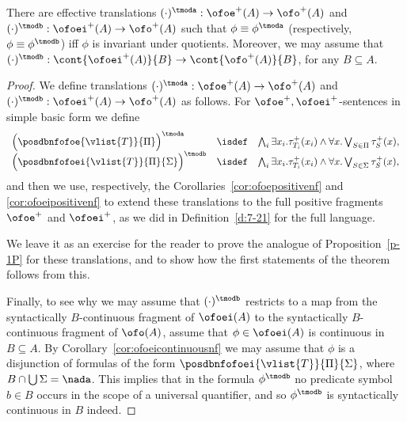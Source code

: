 \begin{theorem}
\label{t:inv1}
There are effective translations $(\cdot)^{\tmoda}: \ofoe^{+}(A) \to 
\ofo^{+}(A)$ and $(\cdot)^{\tmodb}: {\ofoei}^{+}(A) \to \ofo^{+}(A)$ such that 
$\phi \equiv \phi^{\tmoda}$ (respectively, $\phi \equiv \phi^{\tmodb}$) iff 
$\phi$ is invariant under quotients.
Moreover, we may assume that 
$(\cdot)^{\tmodb}: \cont{{\ofoei}^{+}(A)}{B} \to \cont{\ofo^{+}(A)}{B}$,
for any $B \subseteq A$.
\end{theorem}
\begin{proof}
We define translations $(\cdot)^{\tmoda}: {\ofoe}^{+}(A) \to {\ofo}^{+}(A)$ and 
$(\cdot)^{\tmodb}: {\ofoei}^{+}(A) \to {\ofo}^{+}(A)$ as follows. 
For $\ofoe^{+},{\ofoei}^{+}$-sentences in simple basic form we define
\[\begin{array}{lll}
     \Big( \posdbnfofoe{\vlist{T}}{\Pi} \Big)^{\tmoda} 
   & \isdef 
   & \bigwedge_{i} \exists x_i. \tau^+_{T_i}(x_i) 
     \land \forall x. \bigvee_{S\in\Pi} \tau^+_S(x),
\\   \Big( \posdbnfofoei{\vlist{T}}{\Pi}{\Sigma} \Big)^{\tmodb} 
   & \isdef 
   & \bigwedge_{i} \exists x_i. \tau^+_{T_i}(x_i) 
     \land \forall x. \bigvee_{S\in\Sigma} \tau^+_S(x),
\end{array}\]
and then we use, respectively, the Corollaries~\ref{cor:ofoepositivenf} and
\ref{cor:ofoeipositivenf} to extend these translations to the full positive
fragments $\ofoe^{+}$ and ${\ofoei}^{+}$, as we did in Definition~\ref{d:7-21}
for the full language.

We leave it as an exercise for the reader to prove the analogue of 
Proposition~\ref{p-1P} for these translations, and to show how the first
statements of the theorem
follows from this.

Finally, to see why we may assume that $(\cdot)^{\tmodb}$ restricts to a map 
from the syntactically $B$-continuous fragment of $\ofoei(A)$ to the 
syntactically $B$-continuous fragment of $\ofo(A)$, assume that $\phi 
\in \ofoei(A)$ is continuous in $B \subseteq A$.
By Corollary~\ref{cor:ofoeicontinuousnf} we may assume that $\phi$ is a
disjunction of formulas of the form $\posdbnfofoei{\vlist{T}}{\Pi}{\Sigma}$,
where $B \cap \bigcup \Sigma = \nada$.
This implies that in the formula $\phi^{\tmodb}$ no predicate symbol $b \in
B$ occurs in the scope of a universal quantifier, and so $\phi^{\tmodb}$
is syntactically continuous in $B$ indeed.
\end{proof}